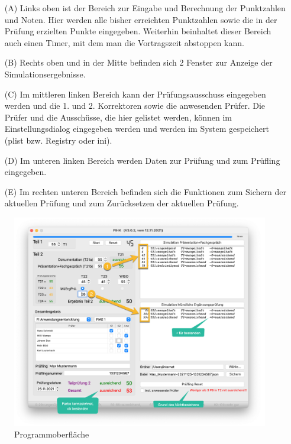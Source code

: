 \documentclass[a4paper,notitlepage,parskip=half]{scrartcl}
\begin{document}
\begin{itemize}
\item[(A)] Links oben ist der Bereich zur Eingabe und Berechnung der Punktzahlen und Noten. 
Hier werden alle bisher erreichten Punktzahlen sowie die in der Prüfung erzielten Punkte eingegeben.
Weiterhin beinhaltet dieser Bereich auch einen Timer, mit dem man die Vortragszeit abstoppen kann.
\item[(B)] Rechts oben und in der Mitte befinden sich 2 Fenster zur Anzeige der Simulationsergebnisse.
\item[(C)] Im mittleren linken Bereich kann der Prüfungsausschuss eingegeben werden und die 1. und 2. Korrektoren sowie die anwesenden Prüfer. Die Prüfer und die Ausschüsse, die hier gelistet werden, können im Einstellungsdialog eingegeben werden und werden im System gespeichert (plist bzw. Registry oder ini).
\item[(D)] Im unteren linken Bereich werden Daten zur Prüfung und zum Prüfling eingegeben.
\item[(E)] Im rechten unteren Bereich befinden sich die Funktionen zum Sichern der aktuellen Prüfung und zum Zurücksetzen der aktuellen Prüfung.
\end{itemize} 

\begin{figure}[ht]
    \centering
    \includegraphics[width=\textwidth]{HauptfensterKommentiert2.png}
    \caption{Programmoberfläche}
    \label{fig:hauptfensterKommentiert2}
\end{figure}
\end{document}
